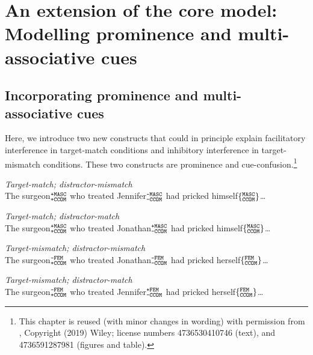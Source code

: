 \documentclass{cambridge7A}\usepackage[]{graphicx}\usepackage[]{color}
\newcommand{\featureset}[2]{$\{^{\texttt{\uppercase{#1}}}_{\texttt{\uppercase{#2}}}\}$}
\newcommand{\featuresetNP}[2]{$^{\texttt{\uppercase{#1}}}_{\texttt{\uppercase{#2}}}$}
\begin{document}

\chapter[Extension: Prominence and multi-associative cues]{An extension of the core model: Modelling prominence and multi-associative cues} \label{c02prominence}

\section{Incorporating prominence and multi-associative cues}

Here, we introduce two new constructs that could in principle explain facilitatory interference in target-match conditions and inhibitory interference in target-mismatch conditions. These two constructs are  prominence and cue-confusion.\footnote{This chapter is reused (with minor changes in wording) with permission from \cite{EngelmannJaegerVasishth2019}, Copyright (2019) Wiley; license numbers 4736530410746 (text), and 4736591287981 (figures and table).}

\begin{exe}
\ex\label{ex:sturt03:exp2}
\begin{xlist}
\item \textit{Target-match; distractor-mismatch}\\
The surgeon\featuresetNP{+MASC}{+CCOM} who treated Jennifer\featuresetNP{-MASC}{-CCOM} had pricked himself\featureset{MASC}{CCOM}\dots
\item \textit{Target-match; distractor-match}\\
The surgeon\featuresetNP{+MASC}{+CCOM} who treated Jonathan\featuresetNP{+MASC}{-CCOM} had pricked himself\featureset{MASC}{CCOM}\dots
\item \textit{Target-mismatch; distractor-mismatch}\\
The surgeon\featuresetNP{-FEM}{+CCOM} who treated Jonathan\featuresetNP{-FEM}{-CCOM} had pricked herself\featureset{FEM}{CCOM}\dots
\item \textit{Target-mismatch; distractor-match}\\
The surgeon\featuresetNP{-FEM}{+CCOM} who treated Jennifer\featuresetNP{+FEM}{-CCOM} had pricked herself\featureset{FEM}{CCOM}\dots
\end{xlist}
\end{exe}
\end{document}
